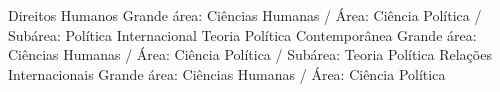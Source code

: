 \begin{cvcitems}
  \cvcitem
    {Direitos Humanos}
    {Grande área: Ciências Humanas / Área: Ciência Política / Subárea: Política Internacional}
  \cvcitem
    {Teoria Política Contemporânea}
    {Grande área: Ciências Humanas / Área: Ciência Política / Subárea: Teoria Política}
  \cvcitem
    {Relações Internacionais}
    {Grande área: Ciências Humanas / Área: Ciência Política}
\end{cvcitems}
